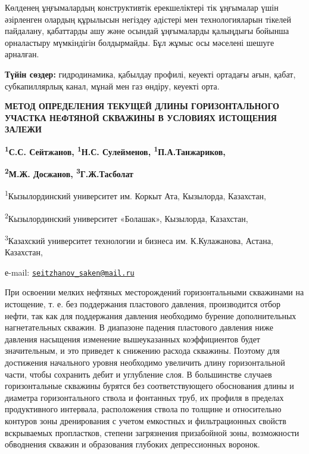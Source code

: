 Көлденең ұңғымалардың конструктивтік ерекшеліктері тік ұңғымалар үшін
әзірленген олардың құрылысын негіздеу әдістері мен технологияларын
тікелей пайдалану, қабаттарды ашу және осындай ұңғымаларды қалыңдығы
бойынша орналастыру мүмкіндігін болдырмайды. Бұл жұмыс осы мәселені
шешуге арналған.

{\bfseries Түйін сөздер:} гидродинамика, қабылдау профилі, кеуекті ортадағы
ағын, қабат, субкапиллярлық канал, мұнай мен газ өндіру, кеуекті орта.

\begin{articleheader}
{\bfseries МЕТОД ОПРЕДЕЛЕНИЯ ТЕКУЩЕЙ ДЛИНЫ ГОРИЗОНТАЛЬНОГО УЧАСТКА НЕФТЯНОЙ
СКВАЖИНЫ В УСЛОВИЯХ ИСТОЩЕНИЯ ЗАЛЕЖИ}

{\bfseries \textsuperscript{1}С.С. Сейтжанов\textsuperscript{\envelope},
\textsuperscript{1}Н.С. Сулейменов, \textsuperscript{1}П.А.Танжариков,}

{\bfseries \textsuperscript{2}М.Ж. Досжанов, \textsuperscript{3}Г.Ж.Тасболат}
\end{articleheader}
\begin{affiliation}

\textsuperscript{1}Кызылординский университет им. Коркыт Ата, Кызылорда,
Казахстан,

\textsuperscript{2}Кызылординский университет «Болашак», Кызылорда,
Казахстан,

\textsuperscript{3}Казахский университет технологии и бизнеса им.
К.Кулажанова, Астана, Казахстан,

е-mail:
\href{mailto:seitzhanov_saken@mail.ru}{\nolinkurl{seitzhanov\_saken@mail.ru}}
\end{affiliation}

При освоении мелких нефтяных месторождений горизонтальными скважинами на
истощение, т. е. без поддержания пластового давления, производится отбор
нефти, так как для поддержания давления необходимо бурение
дополнительных нагнетательных скважин. В диапазоне падения пластового
давления ниже давления насыщения изменение вышеуказанных коэффициентов
будет значительным, и это приведет к снижению расхода скважины. Поэтому
для достижения начального уровня необходимо увеличить длину
горизонтальной части, чтобы сохранить дебит и углубление слоя. В
большинстве случаев горизонтальные скважины бурятся без соответствующего
обоснования длины и диаметра горизонтального ствола и фонтанных труб, их
профиля в пределах продуктивного интервала, расположения ствола по
толщине и относительно контуров зоны дренирования с учетом емкостных и
фильтрационных свойств вскрываемых пропластков, степени загрязнения
призабойной зоны, возможности обводнения скважин и образования глубоких
депрессионных воронок.

